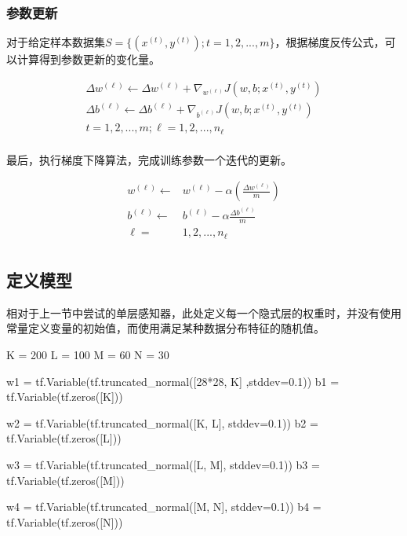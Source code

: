 \begin{content}
\begin{content}
\subsubsection{参数更新}

对于给定样本数据集$ S = \{ ({x^{(t)}},{y^{(t)}});t = 1,2,...,m\} $，根据梯度反传公式，可以计算得到参数更新的变化量。

\[\begin{aligned}
  \Delta {w^{(\ell )}} \leftarrow \Delta {w^{(\ell )}} + {\nabla _{{w^{(\ell )}}}}J\left( {w,b;{x^{(t)}},{y^{(t)}}} \right) \\ 
  \Delta {b^{(\ell )}} \leftarrow \Delta {b^{(\ell )}} + {\nabla _{{b^{(\ell )}}}}J\left( {w,b;{x^{(t)}},{y^{(t)}}} \right) \\ 
  t = 1,2,...,m;\ell  = 1,2,...,{n_\ell } \\ 
\end{aligned} \]

最后，执行梯度下降算法，完成训练参数一个迭代的更新。

\[\begin{aligned}
  {w^{(\ell )}} \leftarrow  & {w^{(\ell )}} - \alpha \left( {\frac{{\Delta {w^{(\ell )}}}}{m}} \right) \\ 
  {b^{(\ell )}} \leftarrow  & {b^{(\ell )}} - \alpha \frac{{\Delta {b^{(\ell )}}}}{m} \\ 
  \ell  = & 1,2,...,{n_\ell }  \\
\end{aligned} \]

\subsection{定义模型}

相对于上一节中尝试的单层感知器，此处定义每一个隐式层的权重时，并没有使用常量定义变量的初始值，而使用满足某种数据分布特征的随机值。

\begin{leftbar}
\begin{python}
K = 200
L = 100
M = 60
N = 30

w1 = tf.Variable(tf.truncated_normal([28*28, K] ,stddev=0.1)) 
b1 = tf.Variable(tf.zeros([K]))

w2 = tf.Variable(tf.truncated_normal([K, L], stddev=0.1))
b2 = tf.Variable(tf.zeros([L]))

w3 = tf.Variable(tf.truncated_normal([L, M], stddev=0.1)) 
b3 = tf.Variable(tf.zeros([M]))

w4 = tf.Variable(tf.truncated_normal([M, N], stddev=0.1)) 
b4 = tf.Variable(tf.zeros([N]))


\end{python}
\end{leftbar}
\end{content}
\end{content}
